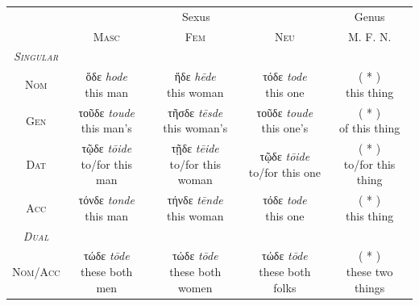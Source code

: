 \documentclass[10pt,a4paper,notitlepage]{article}
\newcommand{\tsc}[1]{\textsc{#1}}
\newcommand*{\grc}[1]{\fontspec{Inter}#1\rmfamily}
\newcommand{\trc}[1]{\textit{\fontspec{Tinos}#1}}
\begin{document}
    \begin{table}[H]
        \begin{tabular}{c|ccc|c}
            & \multicolumn{3}{c|}{Sexus} & Genus \\
            & \tsc{Masc} & \tsc{Fem} & \tsc{Neu} & \tsc{M. F. N.} \\
        \hline
            \emph{\tsc{Singular}} & & & & \\
            \tsc{Nom} & \makecell{\grc{ὅδε} \trc{hode} \\ \small this man} & \makecell{\grc{ἥδε} \trc{hēde} \\ \small this woman} & \makecell{\grc{τόδε} \trc{tode} \\ \small this one} & \makecell{( * ) \\ \small this thing} \\
            \tsc{Gen} & \makecell{\grc{τοῦδε} \trc{toude} \\ \small this man's} & \makecell{\grc{τῆσδε} \trc{tēsde} \\ \small this woman's} & \makecell{\grc{τοῦδε} \trc{toude} \\ \small this one's} & \makecell{( * ) \\ \small of this thing} \\
            \tsc{Dat} & \makecell{\grc{τῷδε} \trc{tōide} \\ \small to/for this man} & \makecell{\grc{τῇδε} \trc{tēide} \\ \small to/for this woman} & \makecell{\grc{τῷδε} \trc{tōide} \\ \small to/for this one} & \makecell{( * ) \\ \small to/for this thing} \\
            \tsc{Acc} & \makecell{\grc{τόνδε} \trc{tonde} \\ \small this man} & \makecell{\grc{τήνδε} \trc{tēnde} \\ \small this woman} & \makecell{\grc{τόδε} \trc{tode} \\ \small this one} & \makecell{( * ) \\ \small this thing} \\
            \hline
            \emph{\tsc{Dual}} & & & & \\
            \tsc{Nom/Acc} & \makecell{\grc{τώδε} \trc{tōde} \\ \small these both men} & \makecell{\grc{τώδε} \trc{tōde} \\ \small these both women} & \makecell{\grc{τώδε} \trc{tōde} \\ \small these both folks} & \makecell{( * ) \\ \small these two things} \\

\end{tabular}
\end{table}
\end{document}
